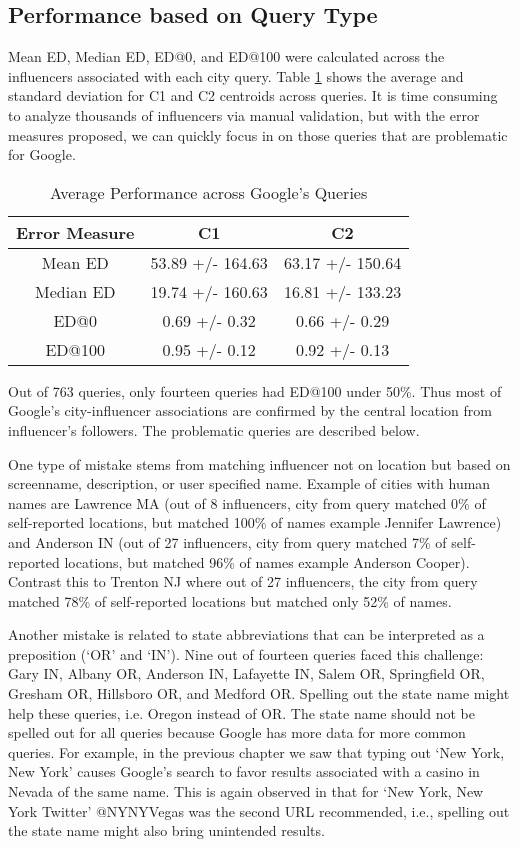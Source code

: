 \subsection{Performance based on Query Type}

Mean ED, Median ED, ED@0, and ED@100 were calculated across the influencers associated with each city query. Table \ref{table_4_4} shows the average and standard deviation for C1 and C2 centroids across queries. It is time consuming to analyze thousands of influencers via manual validation, but with the error measures proposed, we can quickly focus in on those queries that are problematic for Google. 

\begin{table}
\small
\caption{Average Performance across Google's Queries}
\label{table_4_4}
\begin{center}
\begin{tabular}{|c|c|c|}
\hline
\bfseries Error Measure & \bfseries C1 & \bfseries C2\\
\hline
Mean ED&53.89 +/- 164.63&63.17 +/- 150.64\\
\hline
Median ED&19.74 +/- 160.63&16.81 +/- 133.23\\
\hline
ED@0&0.69 +/- 0.32&0.66 +/- 0.29\\
\hline
ED@100&0.95 +/- 0.12&0.92 +/- 0.13\\
\hline
\end{tabular}
\end{center}
\end{table}

Out of 763 queries, only fourteen queries had ED@100 under 50\%. Thus most of Google's city-influencer associations are confirmed by the central location from influencer's followers. The problematic queries are described below.

One type of mistake stems from matching influencer not on location but based on screenname, description, or user specified name. Example of cities with human names are Lawrence MA (out of 8 influencers, city from query matched 0\% of self-reported locations, but matched 100\% of names example Jennifer Lawrence) and Anderson IN (out of 27 influencers, city from query matched 7\% of self-reported locations, but matched 96\% of names example Anderson Cooper). Contrast this to Trenton NJ where out of 27 influencers, the city from query matched 78\% of self-reported locations but matched only 52\% of names. 

Another mistake is related to state abbreviations that can be interpreted as a preposition (`OR' and `IN'). Nine out of fourteen queries faced this challenge: Gary IN, Albany OR, Anderson IN, Lafayette IN, Salem OR, Springfield OR, Gresham OR, Hillsboro OR, and Medford OR. Spelling out the state name might help these queries, i.e. Oregon instead of OR. The state name should not be spelled out for all queries because Google has more data for more common queries. For example, in the previous chapter we saw that typing out `New York, New York' causes Google's search to favor results associated with a casino in Nevada of the same name. This is again observed in that for `New York, New York Twitter' @NYNYVegas was the second URL recommended, i.e., spelling out the state name might also bring unintended results.

